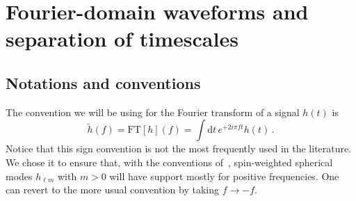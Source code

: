 \documentclass[aps,showpacs,twocolumn,
prd,superscriptaddress,nofootinbib]{revtex4-1}
\newcommand{\be}{\begin{equation}}
\newcommand{\ee}{\end{equation}}
\newcommand\ud{{\mathrm{d}}}
\begin{document}

\section{Fourier-domain waveforms and separation of timescales}
\label{sec:motivation}


\subsection{Notations and conventions}
\label{subsec:notations}

The convention we will be using for the Fourier transform of a signal $h(t)$ is
\be\label{eq:defFT}
	\tilde{h}(f) = \mathrm{FT}[h](f) =  \int \ud t \, e^{+2i\pi f t} h(t) \,.
\ee
Notice that this sign convention is not the most frequently used in the literature. We chose it to ensure that, with the conventions of~\cite{BlanchetLiving}, spin-weighted spherical modes $h_{\ell m}$ with $m>0$ will have support mostly for positive frequencies. One can revert to the more usual convention by taking $f\rightarrow -f$.
\end{document}
